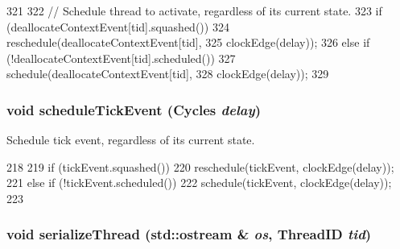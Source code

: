 \begin{DoxyCode}
321     {
322         // Schedule thread to activate, regardless of its current state.
323         if (deallocateContextEvent[tid].squashed())
324             reschedule(deallocateContextEvent[tid],
325                        clockEdge(delay));
326         else if (!deallocateContextEvent[tid].scheduled())
327             schedule(deallocateContextEvent[tid],
328                      clockEdge(delay));
329     }
\end{DoxyCode}
\hypertarget{classFullO3CPU_a71eb9ea7b25032de341033111b946dfc}{
\subsubsection[{scheduleTickEvent}]{\setlength{\rightskip}{0pt plus 5cm}void scheduleTickEvent ({\bf Cycles} {\em delay})}}
\label{classFullO3CPU_a71eb9ea7b25032de341033111b946dfc}
Schedule tick event, regardless of its current state. 


\begin{DoxyCode}
218     {
219         if (tickEvent.squashed())
220             reschedule(tickEvent, clockEdge(delay));
221         else if (!tickEvent.scheduled())
222             schedule(tickEvent, clockEdge(delay));
223     }
\end{DoxyCode}
\hypertarget{classFullO3CPU_a688ca491f5419c29fb81f8235ba1dc13}{
\subsubsection[{serializeThread}]{\setlength{\rightskip}{0pt plus 5cm}void serializeThread (std::ostream \& {\em os}, \/  {\bf ThreadID} {\em tid})}}
\label{classFullO3CPU_a688ca491f5419c29fb81f8235ba1dc13}



